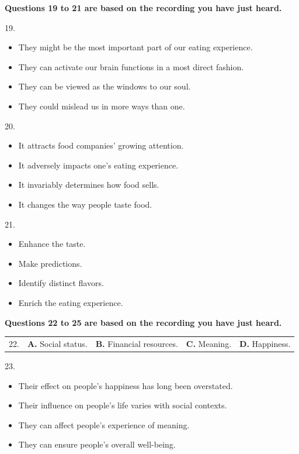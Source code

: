 \documentclass[UTF8,11pt]{ctexart}
\begin{document}
\textbf{Questions 19 to 21 are based on the recording you have just heard.}


19.


\begin{itemize}[leftmargin=2em,itemsep=.2em,topsep=.4em]\item[A.] They might be the most important part of our eating experience.
\item[B.] They can activate our brain functions in a most direct fashion.
\item[C.] They can be viewed as the windows to our soul.
\item[D.] They could mislead us in more ways than one.
\end{itemize}

20.


\begin{itemize}[leftmargin=2em,itemsep=.2em,topsep=.4em]\item[A.] It attracts food companies’ growing attention.
\item[B.] It adversely impacts one’s eating experience.
\item[C.] It invariably determines how food sells.
\item[D.] It changes the way people taste food.
\end{itemize}

21.


\begin{itemize}[leftmargin=2em,itemsep=.2em,topsep=.4em]\item[A.] Enhance the taste.
\item[B.] Make predictions.
\item[C.] Identify distinct flavors.
\item[D.] Enrich the eating experience.
\end{itemize}

\textbf{Questions 22 to 25 are based on the recording you have just heard.}


\noindent\begin{tabularx}{\linewidth}{@{}lXXXX@{}}22. & \textbf{A.} Social status. & \textbf{B.} Financial resources. & \textbf{C.} Meaning. & \textbf{D.} Happiness.\\\end{tabularx}\par

23.


\begin{itemize}[leftmargin=2em,itemsep=.2em,topsep=.4em]\item[A.] Their effect on people’s happiness has long been overstated.
\item[B.] Their influence on people’s life varies with social contexts.
\item[C.] They can affect people’s experience of meaning.
\item[D.] They can ensure people’s overall well-being.
\end{itemize}
\end{document}
